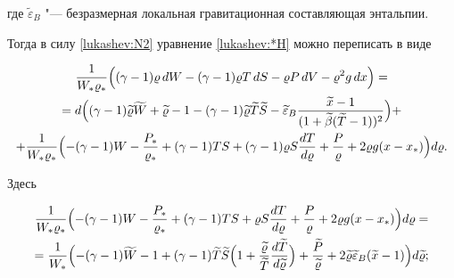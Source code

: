 где $\widetilde{\varepsilon}_B$ "--- безразмерная локальная гравитационная составляющая энтальпии.

Тогда в силу \eqref{lukashev:N2} уравнение \eqref{lukashev:*H} можно переписать в виде

\begin{multline}

\label{lukashev:H}

\frac1{W_*\varrho_*}

\Bigl(

(\gamma-1) \varrho \,dW-(\gamma-1)\varrho T \,dS-

\varrho P \, dV-\varrho^2 g \,dx

\Bigr)=\\

=d

\Bigl(

(\gamma-1)\widetilde{\varrho}\widetilde{W}+\widetilde{\varrho}-1-

(\gamma-1)\widetilde{\varrho}\widetilde{T}\widetilde{S}- \widetilde{\varepsilon}_B

\frac{\widetilde{x}-1}{(1+\widetilde{\beta}(\widetilde{T}-1))^2}  

\Bigr)+\\

+\frac1{W_*\varrho_*}

\Bigl(

-(\gamma-1) W-\frac{P_*}{\varrho_*}+(\gamma-1)TS+

(\gamma-1)\varrho S \frac{dT}{d\varrho}+

\frac{P}{\varrho}+2\varrho g(x-x_*) \Bigr) d\varrho.

\end{multline}

Здесь

\begin{multline}

\label{lukashev:addH}

\frac1{W_*\varrho_*}

\Bigl(

-(\gamma-1) W-\frac{P_*}{\varrho_*}+(\gamma-1)TS+\varrho S \frac{dT}{d\varrho}+

\frac{P}{\varrho}+2\varrho g(x-x_*)

\Bigr) d\varrho=\\

=\frac1{W_*}

\Bigl(

-(\gamma-1)\widetilde{W}-1+(\gamma-1)\widetilde{T}\widetilde{S}

\Bigl(1+\frac{\widetilde{\varrho}}{\widetilde{T}}\frac{d\widetilde{T}}{d\widetilde{\varrho}}\Bigr)+

\frac{\widetilde{P}}{\widetilde{\varrho}}+2\widetilde{\varrho} \widetilde{\varepsilon}_B 

(\widetilde{x}-1)

\Bigr) d\widetilde{\varrho};

\end{multline}

